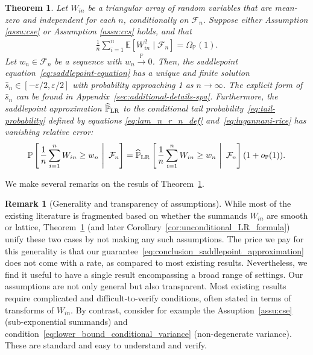 \documentclass[12pt]{article}
\newtheorem{theorem}{Theorem}
\theoremstyle{definition}
\newtheorem{remark}{Remark}
\def\P{\mathbb{P}}
\def\P{\mathbb{P}}
\newcommand{\E}{\mathbb E}								%
\renewcommand{\P}{\mathbb{P}}							%
\begin{document}
  \begin{theorem}\label{thm:unified_unnormalized_moment_conditions}
	  Let $W_{in}$ be a triangular array of random variables that are mean-zero and independent for each $n$, conditionally on $\mathcal F_n$. Suppose either Assumption \ref{assu:cse} or Assumption \ref{assu:ccs} holds, and that
	  \begin{align}\label{eq:lower_bound_conditional_variance}
		  \frac{1}{n}\sum_{i=1}^n \E[W_{in}^2 \mid \mathcal{F}_n]=\Omega_{\P}(1).
	  \end{align}
	  Let $w_n \in \mathcal F_n$ be a sequence with $w_n \overset{\P} \rightarrow 0$. Then, the saddlepoint equation~\eqref{eq:saddlepoint-equation} has a unique and finite solution $\hat s_n \in [-\varepsilon/2, \varepsilon/2]$ with probability approaching 1 as $n \rightarrow \infty$. The explicit form of $\hat s_n$ can be found in Appendix~\ref{sec:additional-details-spa}. Furthermore, the saddlepoint approximation $\widehat{\P}_{\textnormal{LR}}$ to the conditional tail probability~\eqref{eq:tail-probability} defined by equations \eqref{eq:lam_n_r_n_def} and~\eqref{eq:lugannani-rice} has vanishing relative error:
	  \begin{align}\label{eq:conclusion_saddlepoint_approximation}
		\P\left[\left.\frac{1}{n}\sum_{i = 1}^n W_{in} \geq w_n\ \right|\ \mathcal{F}_n\right] = \widehat{\P}_{\textnormal{LR}}\left[\left.\frac{1}{n}\sum_{i = 1}^n W_{in} \geq w_n\ \right|\ \mathcal{F}_n\right](1+o_{\P}(1)).
	  \end{align}
  \end{theorem}
  We make several remarks on the resuls of Theorem~\ref{thm:unified_unnormalized_moment_conditions}.
  \begin{remark}[Generality and transparency of assumptions]\label{rmk:generality-transparency}
	While most of the existing literature is fragmented based on whether the summands $W_{in}$ are smooth or lattice, Theorem~\ref{thm:unified_unnormalized_moment_conditions} (and later Corollary~\ref{cor:unconditional_LR_formula}) unify these two cases by not making any such assumptions. The price we pay for this generality is that our guarantee~\eqref{eq:conclusion_saddlepoint_approximation} does not come with a rate, as compared to most existing results. Nevertheless, we find it useful to have a single result encompassing a broad range of settings. Our assumptions are not only general but also transparent. Most existing results require complicated and difficult-to-verify conditions, often stated in terms of transforms of $W_{in}$. By contrast, consider for example the Assuption~\ref{assu:cse} (sub-exponential summands) and condition~\eqref{eq:lower_bound_conditional_variance} (non-degenerate variance). These are standard and easy to understand and verify.
  \end{remark}
  
\end{document}
